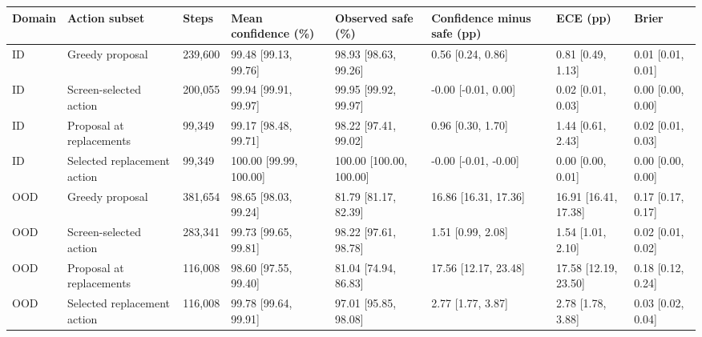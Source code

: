 \begin{tabular}{llllllll}
\toprule
Domain & Action subset & Steps & Mean confidence (\%) & Observed safe (\%) & Confidence minus safe (pp) & ECE (pp) & Brier \\
\midrule
ID & Greedy proposal & 239,600 & 99.48 [99.13, 99.76] & 98.93 [98.63, 99.26] & 0.56 [0.24, 0.86] & 0.81 [0.49, 1.13] & 0.01 [0.01, 0.01] \\
ID & Screen-selected action & 200,055 & 99.94 [99.91, 99.97] & 99.95 [99.92, 99.97] & -0.00 [-0.01, 0.00] & 0.02 [0.01, 0.03] & 0.00 [0.00, 0.00] \\
ID & Proposal at replacements & 99,349 & 99.17 [98.48, 99.71] & 98.22 [97.41, 99.02] & 0.96 [0.30, 1.70] & 1.44 [0.61, 2.43] & 0.02 [0.01, 0.03] \\
ID & Selected replacement action & 99,349 & 100.00 [99.99, 100.00] & 100.00 [100.00, 100.00] & -0.00 [-0.01, -0.00] & 0.00 [0.00, 0.01] & 0.00 [0.00, 0.00] \\
OOD & Greedy proposal & 381,654 & 98.65 [98.03, 99.24] & 81.79 [81.17, 82.39] & 16.86 [16.31, 17.36] & 16.91 [16.41, 17.38] & 0.17 [0.17, 0.17] \\
OOD & Screen-selected action & 283,341 & 99.73 [99.65, 99.81] & 98.22 [97.61, 98.78] & 1.51 [0.99, 2.08] & 1.54 [1.01, 2.10] & 0.02 [0.01, 0.02] \\
OOD & Proposal at replacements & 116,008 & 98.60 [97.55, 99.40] & 81.04 [74.94, 86.83] & 17.56 [12.17, 23.48] & 17.58 [12.19, 23.50] & 0.18 [0.12, 0.24] \\
OOD & Selected replacement action & 116,008 & 99.78 [99.64, 99.91] & 97.01 [95.85, 98.08] & 2.77 [1.77, 3.87] & 2.78 [1.78, 3.88] & 0.03 [0.02, 0.04] \\
\bottomrule
\end{tabular}
